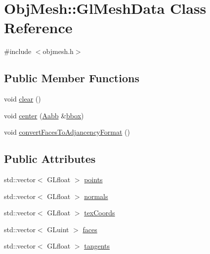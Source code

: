 \hypertarget{class_obj_mesh_1_1_gl_mesh_data}{}\section{Obj\+Mesh\+::Gl\+Mesh\+Data Class Reference}
\label{class_obj_mesh_1_1_gl_mesh_data}


{\ttfamily \#include $<$objmesh.\+h$>$}

\subsection*{Public Member Functions}
\begin{DoxyCompactItemize}
\item 
void \mbox{\hyperlink{class_obj_mesh_1_1_gl_mesh_data_a838c07448b2659be9e7ec4791aef9b3b}{clear}} ()
\item 
void \mbox{\hyperlink{class_obj_mesh_1_1_gl_mesh_data_a7a9ac7f841c7259f609657c00a390c1c}{center}} (\mbox{\hyperlink{class_aabb}{Aabb}} \&\mbox{\hyperlink{class_obj_mesh_a21ce3155628d670cec7b107959a6788b}{bbox}})
\item 
void \mbox{\hyperlink{class_obj_mesh_1_1_gl_mesh_data_a67b72495deefe2d8384a90833a031688}{convert\+Faces\+To\+Adjancency\+Format}} ()
\end{DoxyCompactItemize}
\subsection*{Public Attributes}
\begin{DoxyCompactItemize}
\item 
std\+::vector$<$ G\+Lfloat $>$ \mbox{\hyperlink{class_obj_mesh_1_1_gl_mesh_data_a7d10390e16f8b6e2fa735da82912303a}{points}}
\item 
std\+::vector$<$ G\+Lfloat $>$ \mbox{\hyperlink{class_obj_mesh_1_1_gl_mesh_data_a4e463034144cacccc60ed9e22824f70e}{normals}}
\item 
std\+::vector$<$ G\+Lfloat $>$ \mbox{\hyperlink{class_obj_mesh_1_1_gl_mesh_data_a0a863da25802937a9d49df3b747d7680}{tex\+Coords}}
\item 
std\+::vector$<$ G\+Luint $>$ \mbox{\hyperlink{class_obj_mesh_1_1_gl_mesh_data_af7cdf7bebfd88cf6ff6ceadbbb52db96}{faces}}
\item 
std\+::vector$<$ G\+Lfloat $>$ \mbox{\hyperlink{class_obj_mesh_1_1_gl_mesh_data_aaeaf05f9e65060ca6fe381ac1f727a4b}{tangents}}
\end{DoxyCompactItemize}


